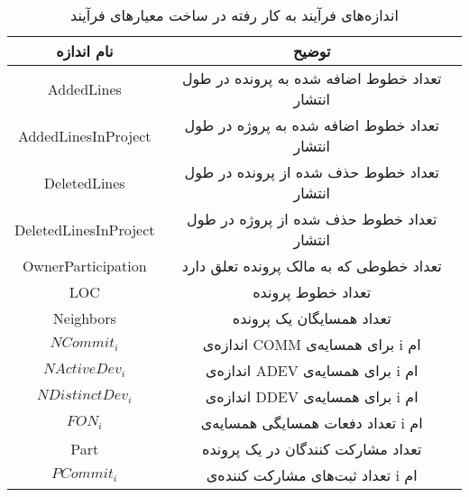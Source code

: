  \begin{table}[H] 
	\renewcommand*{\arraystretch}{1.5}	
	\centering \caption{اندازه‌های فرآیند به کار رفته در ساخت معیارهای فرآیند 
	}
	\label{tab:process-measures2}
	
	\begin{tabular}{|c|c|}
		
		\hline
		\hline
		نام اندازه  & توضیح
		\\
		
		\hline
		\hline
		AddedLines &
		تعداد خطوط اضافه شده به پرونده در طول انتشار
		\\
		\hline
		AddedLinesInProject & 
		تعداد خطوط اضافه شده به پروژه در طول انتشار
		\\ 
		\hline
			DeletedLines &
		تعداد خطوط حذف شده از پرونده در طول انتشار
		\\
		\hline
		DeletedLinesInProject & 
		تعداد خطوط حذف شده از پروژه در طول انتشار
		\\ 
		\hline
		OwnerParticipation & تعداد خطوطی که به مالک پرونده تعلق دارد
		\\
		\hline
		LOC & تعداد خطوط پرونده
		\\
		\hline
	Neighbors & تعداد همسایگان یک پرونده
	\\ \hline
	$NCommit_i$ &
	اندازه‌ی COMM  برای همسایه‌ی i ام
	\\ \hline
	$NActiveDev_i$ & 
اندازه‌ی ADEV برای همسایه‌ی i ام 
	\\ \hline
	$NDistinctDev_i$ &
	اندازه‌ی DDEV برای همسایه‌ی  i ام
	\\ \hline
	$FON_i$ & 
	تعداد دفعات همسایگی  همسایه‌ی i ام\\
	\hline
Part & 
تعداد مشارکت کنند‌گان در یک پرونده 
\\ \hline
	$PCommit_i$ &
	 تعداد ثبت‌‌‌های مشارکت کننده‌ی i ام
	 \\ \hline
	
	
	
		
	\end{tabular}
\end{table}

